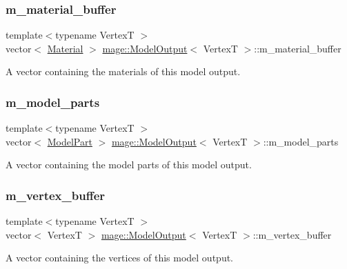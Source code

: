 \subsubsection{\texorpdfstring{m\+\_\+material\+\_\+buffer}{m\_material\_buffer}}
{\footnotesize\ttfamily template$<$typename VertexT $>$ \\
vector$<$ \hyperlink{classmage_1_1_material}{Material} $>$ \hyperlink{structmage_1_1_model_output}{mage\+::\+Model\+Output}$<$ VertexT $>$\+::m\+\_\+material\+\_\+buffer}

A vector containing the materials of this model output. \hypertarget{structmage_1_1_model_output_a86df369ff4959458ee6991c36e6aa01a}{}\label{structmage_1_1_model_output_a86df369ff4959458ee6991c36e6aa01a} 
\subsubsection{\texorpdfstring{m\+\_\+model\+\_\+parts}{m\_model\_parts}}
{\footnotesize\ttfamily template$<$typename VertexT $>$ \\
vector$<$ \hyperlink{structmage_1_1_model_part}{Model\+Part} $>$ \hyperlink{structmage_1_1_model_output}{mage\+::\+Model\+Output}$<$ VertexT $>$\+::m\+\_\+model\+\_\+parts}

A vector containing the model parts of this model output. \hypertarget{structmage_1_1_model_output_a4d669b5fee2d6a1bc993a94b0a2d5580}{}\label{structmage_1_1_model_output_a4d669b5fee2d6a1bc993a94b0a2d5580} 
\subsubsection{\texorpdfstring{m\+\_\+vertex\+\_\+buffer}{m\_vertex\_buffer}}
{\footnotesize\ttfamily template$<$typename VertexT $>$ \\
vector$<$ VertexT $>$ \hyperlink{structmage_1_1_model_output}{mage\+::\+Model\+Output}$<$ VertexT $>$\+::m\+\_\+vertex\+\_\+buffer}

A vector containing the vertices of this model output. 